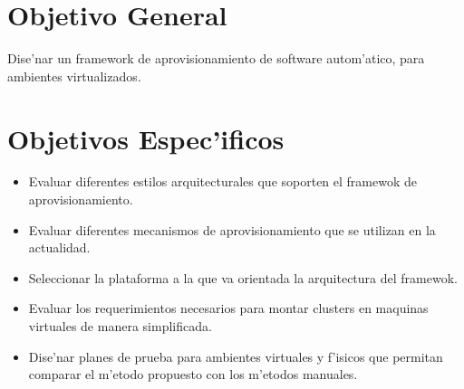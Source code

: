 \section{Objetivo General}
Dise'nar un framework de aprovisionamiento de software autom'atico, para ambientes virtualizados.

\section{Objetivos Espec'ificos}
\begin{itemize}
\item Evaluar diferentes estilos arquitecturales que soporten el framewok de aprovisionamiento.
\item Evaluar diferentes mecanismos de aprovisionamiento que se utilizan en la actualidad.
\item Seleccionar la plataforma a la que va orientada la arquitectura del framewok.
\item Evaluar los requerimientos necesarios para montar clusters en maquinas virtuales de manera simplificada.
\item Dise'nar planes de prueba para ambientes virtuales y f'isicos que permitan comparar el m'etodo propuesto con los m'etodos manuales.
\end{itemize}
